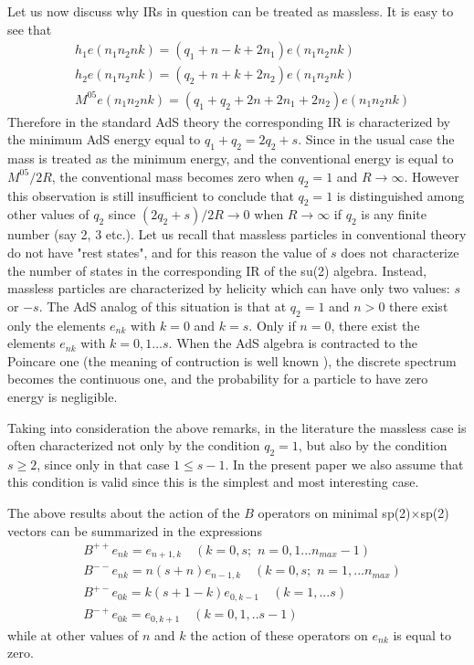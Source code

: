 \documentclass[a4paper,12pt]{article}%
\begin{document}
Let us now discuss why IRs in question can be
treated as massless. It is easy to see that
\begin{eqnarray}
&h_1e(n_1n_2nk)=(q_1+n-k+2n_1)e(n_1n_2nk)\nonumber\\
&h_2e(n_1n_2nk)=(q_2+n+k+2n_2)e(n_1n_2nk)\nonumber\\
&M^{05}e(n_1n_2nk)=(q_1+q_2+2n+2n_1+2n_2)e(n_1n_2nk)
\label{22}
\end{eqnarray}
Therefore in the standard AdS theory the
corresponding IR is characterized by the minimum
AdS energy equal to $q_1+q_2=2q_2+s$. Since in the
usual case the mass is treated as the minimum energy,
and the conventional energy is equal to $M^{05}/2R$,
the conventional mass becomes zero when $q_2=1$ and
$R\rightarrow \infty$. However this observation is 
still insufficient to conclude that $q_2=1$ is
distinguished among other values of $q_2$ since 
$(2q_2+s)/2R\rightarrow 0$ when $R\rightarrow \infty$
if $q_2$ is any finite number (say 2, 3 etc.).
Let us recall that massless particles in conventional 
theory do not have "rest states", and for this reason
the value of $s$ does not characterize the number of
states in the corresponding IR of the su(2) algebra.
Instead, massless particles are characterized by
helicity which can have only two values: $s$ or $-s$. 
The AdS analog of this situation is that at $q_2=1$
and $n>0$ there exist only the elements $e_{nk}$ with
$k=0$ and $k=s$. Only if $n=0$, there exist the elements
$e_{nk}$ with $k=0,1...s$. When the AdS algebra is
contracted to the Poincare one (the meaning of contruction
is well known \cite{IW}), the discrete spectrum becomes
the continuous one, and the probability for a particle
to have zero energy is negligible.

Taking into consideration the above remarks, in the
literature the massless case is often characterized not
only by the condition $q_2=1$, but also by the condition
$s\geq 2$, since only in that case $1\leq s-1$. In the
present paper we also assume that this condition is valid
since this is the simplest and most interesting case.

The above results about the action of the $B$ operators on
minimal sp(2)$\times$sp(2) vectors can be summarized in
the expressions
\begin{eqnarray}
&B^{++}e_{nk}=e_{n+1,k}\quad (k=0,s;\,\, n=0,1...n_{max}-1)\nonumber\\
&B^{--}e_{nk}=n(s+n)e_{n-1,k}\quad (k=0,s;\,\, n=1,...n_{max})\nonumber\\
&B^{+-}e_{0k}=k(s+1-k)e_{0,k-1}\quad (k=1,...s)\nonumber\\
&B^{-+}e_{0k}=e_{0,k+1}\quad (k=0,1,..s-1)
\label{23}
\end{eqnarray}
while at other values of $n$ and $k$ the action of these
operators on $e_{nk}$ is equal to zero.
 
\end{document}
